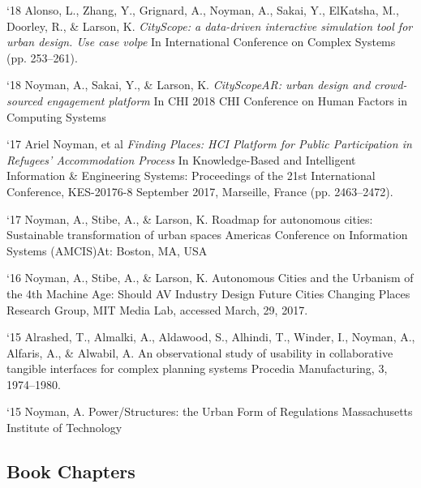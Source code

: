 \begin{tablist}
    \item[`18] \tab  Alonso, L., Zhang, Y., Grignard, A., Noyman, A., Sakai, Y., ElKatsha, M., Doorley, R., \& Larson, K.
    \textit{CityScope: a data-driven interactive simulation tool for urban design. Use case volpe}
    In International Conference on Complex Systems (pp. 253–261).

    \item[`18] \tab  Noyman, A., Sakai, Y., \& Larson, K.
    \textit{CityScopeAR: urban design and crowd-sourced engagement platform
    }In CHI 2018 CHI Conference on Human Factors in Computing Systems
    \item[`17] \tab  Ariel Noyman, et al
    \textit{Finding Places: HCI Platform for Public Participation in Refugees’ Accommodation Process}
    In Knowledge-Based and Intelligent Information \& Engineering Systems: Proceedings of the 21st International Conference, KES-20176-8 September 2017, Marseille, France (pp. 2463–2472).

    \item[`17] \tab  Noyman, A., Stibe, A., \& Larson, K.
    Roadmap for autonomous cities: Sustainable transformation of urban spaces
    Americas Conference on Information Systems (AMCIS)At: Boston, MA, USA

    \item[`16] \tab  Noyman, A., Stibe, A., \& Larson, K.
    Autonomous Cities and the Urbanism of the 4th Machine Age: Should AV Industry Design Future Cities
    Changing Places Research Group, MIT Media Lab, accessed March, 29, 2017.

    \item[`15] \tab  Alrashed, T., Almalki, A., Aldawood, S., Alhindi, T., Winder, I., Noyman, A., Alfaris, A., \& Alwabil, A.
    An observational study of usability in collaborative tangible interfaces for complex planning systems
    Procedia Manufacturing, 3, 1974–1980.

    \item[`15] \tab  Noyman, A.
    Power/Structures: the Urban Form of Regulations
    Massachusetts Institute of Technology

\end{tablist}


\subsection*{Book Chapters}

